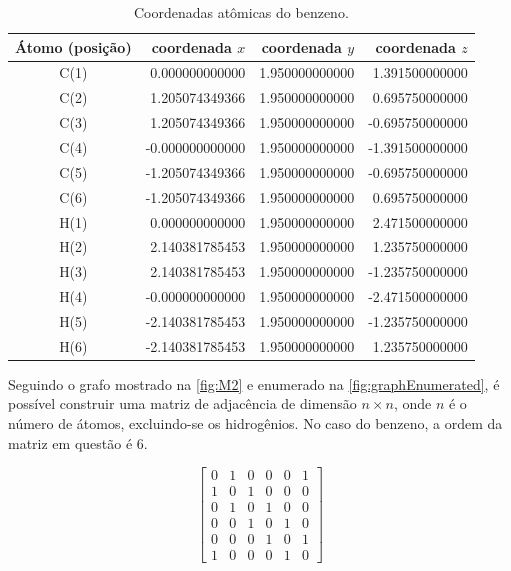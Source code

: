 \begin{table}[htb]
	\centering
	\caption{\label{tab:coords} Coordenadas atômicas do benzeno.}	
	\begin{tabular}{crrr}
		\toprule
		\textbf{Átomo (posição)} & coordenada $x$ & coordenada $y$ & coordenada $z$
		\\ 
		\midrule
C(1)  &    0.000000000000  &   1.950000000000  &   1.391500000000  \\
C(2)  &    1.205074349366  &   1.950000000000  &   0.695750000000  \\
C(3)  &    1.205074349366  &   1.950000000000  &  -0.695750000000  \\
C(4)  &   -0.000000000000  &   1.950000000000  &  -1.391500000000  \\
C(5)  &   -1.205074349366  &   1.950000000000  &  -0.695750000000  \\
C(6)  &   -1.205074349366  &   1.950000000000  &   0.695750000000  \\
H(1)  &    0.000000000000  &   1.950000000000  &   2.471500000000  \\
H(2)  &    2.140381785453  &   1.950000000000  &   1.235750000000  \\
H(3)  &    2.140381785453  &   1.950000000000  &  -1.235750000000  \\
H(4)  &   -0.000000000000  &   1.950000000000  &  -2.471500000000  \\
H(5)  &   -2.140381785453  &   1.950000000000  &  -1.235750000000  \\
H(6)  &   -2.140381785453  &   1.950000000000  &   1.235750000000  \\
    \bottomrule
	\end{tabular}
\end{table}

Seguindo o grafo mostrado na \autoref{fig:M2} e enumerado na \autoref{fig:graphEnumerated}, é possível construir uma matriz de adjacência de dimensão $n \times n$, onde $n$ é o número de átomos, excluindo-se os hidrogênios. No caso do benzeno, a ordem da matriz em questão é 6.

\begin{figure}[htb]
\vspace{0.8\baselineskip}
\begin{equation}
\label{eq:adjmatrix}
\begin{bmatrix}
    0 & 1 & 0 & 0 & 0 & 1 \\
    1 & 0 & 1 & 0 & 0 & 0 \\
    0 & 1 & 0 & 1 & 0 & 0 \\
    0 & 0 & 1 & 0 & 1 & 0 \\
    0 & 0 & 0 & 1 & 0 & 1 \\
    1 & 0 & 0 & 0 & 1 & 0
\end{bmatrix}
\end{equation}
\end{figure}


